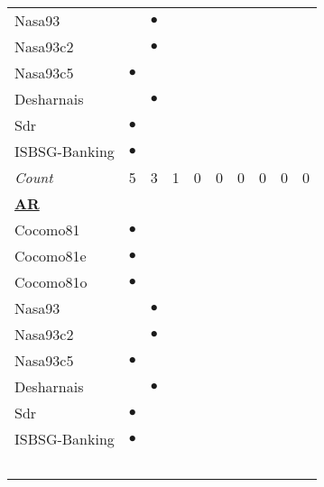 \begin{figure*}[!t]
\begin{tabular}{lccccccccc|}
Nasa93	&		&	$\bullet$	&		&		&		&		&		&		&		\\
Nasa93c2	&		&	$\bullet$	&		&		&		&		&		&		&		\\
Nasa93c5	&	$\bullet$	&		&		&		&		&		&		&		&		\\
Desharnais	&		&	$\bullet$	&		&		&		&		&		&		&		\\
Sdr	&	$\bullet$	&		&		&		&		&		&		&		&		\\
ISBSG-Banking	&	$\bullet$	&		&		&		&		&		&		&		&		\\
\rowcolor{DarkGray}\em Count	&	5	&	3	&	1	&	0	&	0	&	0	&	0	&	0	&	0	\\

%
\hline\multicolumn{10}{l}{ \underline{{\bf AR}}}	\\
Cocomo81	&	$\bullet$	&		&		&		&		&		&		&		&		\\
Cocomo81e	&	$\bullet$	&		&		&		&		&		&		&		&		\\
Cocomo81o	&	$\bullet$	&		&		&		&		&		&		&		&		\\
Nasa93	&		&	$\bullet$	&		&		&		&		&		&		&		\\
Nasa93c2	&		&	$\bullet$	&		&		&		&		&		&		&		\\
Nasa93c5	&	$\bullet$	&		&		&		&		&		&		&		&		\\
Desharnais	&		&	$\bullet$	&		&		&		&		&		&		&		\\
Sdr	&	$\bullet$	&		&		&		&		&		&		&		&		\\
ISBSG-Banking	&	$\bullet$	&		&		&		&		&		&		&		&		\\\

\end{tabular}
\end{figure*}
